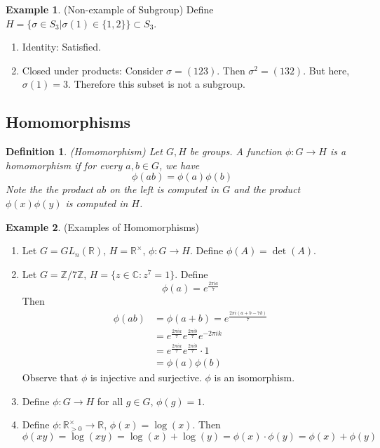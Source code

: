\documentclass[12pt]{article}
\newtheorem{definition}{Definition}
\theoremstyle{definition}
\newtheorem{example}{Example}
\theoremstyle{definition}
\newcommand{\R}{\mathbb{R}}
\begin{document}
\begin{example}(Non-example of Subgroup)
Define $H = \{ \sigma \in S_3 | \sigma(1) \in \{1, 2 \} \} \subset S_3$. 
\begin{enumerate}
	\item Identity: Satisfied.
	\item Closed under products: Consider $\sigma = (1 2 3)$. Then $\sigma^2 = (1 3 2)$. But here, $\sigma(1) = 3$. Therefore this subset is not a subgroup.
\end{enumerate}	
\end{example}

\subsection{Homomorphisms}
\begin{definition}(Homomorphism)
	Let $G, H$ be groups. A function $\phi : G \to H$ is a homomorphism if for every $a,b \in G$, we have 
	\begin{equation}
		\phi(ab) = \phi(a)\phi(b)
	\end{equation}
	Note the the product $ab$ on the left is computed in $G$ and the product $\phi(x)\phi(y)$ is computed in $H$.
\end{definition}

\begin{example}(Examples of Homomorphisms)
\begin{enumerate}
	\item Let $G = GL_n(\mathbb{R})$, $H = \mathbb{R}^{\times}$, $\phi : G \to H$. Define $\phi(A) = \det(A)$.
	\item Let $G = \mathbb{Z} / 7 \mathbb{Z}$, $H = \{z \in \mathbb{C}: z^7 = 1\}$. Define
	\begin{equation}
		\phi(a) = e^{\frac{2\pi i a}{7}}
	\end{equation}
	Then
	\begin{align*}
		\phi(ab) &= \phi(a + b) = e^{\frac{2\pi i (a + b - 7k)}{7}} \\
		&= e^{\frac{2\pi i a}{7}} e^{\frac{2\pi i b}{7}} e^{-2\pi i k}  \\
		&= e^{\frac{2\pi i a}{7}} e^{\frac{2\pi i b}{7}} \cdot 1 \\
		&= \phi(a)\phi(b)
	\end{align*}
	Observe that $\phi$ is injective and surjective. $\phi$ is an isomorphism.
	\item Define $\phi : G \to H$ for all $g \in G$, $\phi(g) = 1$.
	\item Define $\phi : \R^{\times}_{> 0} \to \R$, $\phi(x) = \log(x)$. Then
	\begin{equation}
		\phi(xy) = \log(xy) = \log(x) + \log(y) = \phi(x) \cdot \phi(y) = \phi(x) + \phi(y)
	\end{equation}
\end{enumerate}
\end{example}
\end{document}
